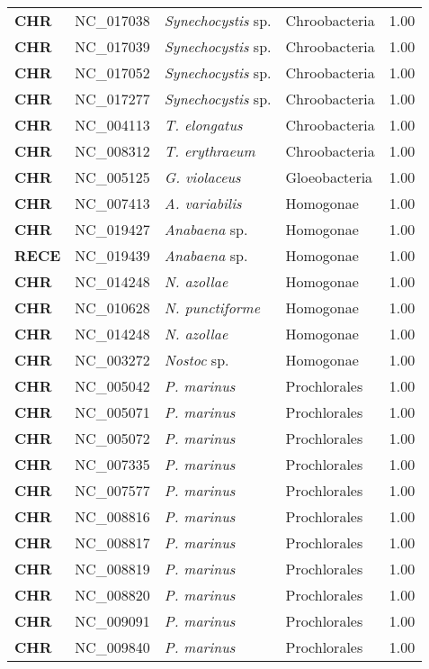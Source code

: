 \begin{adjustwidth}{-3cm}{2cm}
{\begin{supertabular}{>{\bfseries}l|p{0.1\textwidth}p{0.14\textwidth}l|l}
CHR & NC\_017038 & \textit{Synechocystis} sp. & Chroobacteria & 1.00\\
CHR & NC\_017039 & \textit{Synechocystis} sp. & Chroobacteria & 1.00\\
CHR & NC\_017052 & \textit{Synechocystis} sp. & Chroobacteria & 1.00\\
CHR & NC\_017277 & \textit{Synechocystis} sp. & Chroobacteria & 1.00\\
CHR & NC\_004113 & \textit{T. elongatus} & Chroobacteria & 1.00\\
CHR & NC\_008312 & \textit{T. erythraeum} & Chroobacteria & 1.00\\
CHR & NC\_005125 & \textit{G. violaceus} & Gloeobacteria & 1.00\\
CHR & NC\_007413 & \textit{A. variabilis} & Homogonae & 1.00\\
CHR & NC\_019427 & \textit{Anabaena} sp. & Homogonae & 1.00\\
RECE & NC\_019439 & \textit{Anabaena} sp. & Homogonae & 1.00\\
CHR & NC\_014248 & \textit{N. azollae} & Homogonae & 1.00\\
CHR & NC\_010628 & \textit{N. punctiforme} & Homogonae & 1.00\\
CHR & NC\_014248 & \textit{N. azollae} & Homogonae & 1.00\\
CHR & NC\_003272 & \textit{Nostoc} sp. & Homogonae & 1.00\\
CHR & NC\_005042 & \textit{P. marinus} & Prochlorales & 1.00\\
CHR & NC\_005071 & \textit{P. marinus} & Prochlorales & 1.00\\
CHR & NC\_005072 & \textit{P. marinus} & Prochlorales & 1.00\\
CHR & NC\_007335 & \textit{P. marinus} & Prochlorales & 1.00\\
CHR & NC\_007577 & \textit{P. marinus} & Prochlorales & 1.00\\
CHR & NC\_008816 & \textit{P. marinus} & Prochlorales & 1.00\\
CHR & NC\_008817 & \textit{P. marinus} & Prochlorales & 1.00\\
CHR & NC\_008819 & \textit{P. marinus} & Prochlorales & 1.00\\
CHR & NC\_008820 & \textit{P. marinus} & Prochlorales & 1.00\\
CHR & NC\_009091 & \textit{P. marinus} & Prochlorales & 1.00\\
CHR & NC\_009840 & \textit{P. marinus} & Prochlorales & 1.00\\

\end{supertabular}}
\end{adjustwidth}
